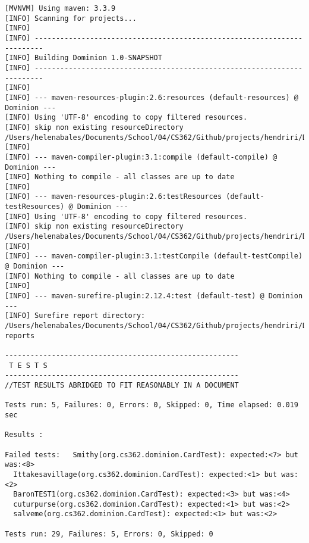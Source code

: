 \begin{lstlisting}
[MVNVM] Using maven: 3.3.9
[INFO] Scanning for projects...
[INFO]                                                                         
[INFO] ------------------------------------------------------------------------
[INFO] Building Dominion 1.0-SNAPSHOT
[INFO] ------------------------------------------------------------------------
[INFO] 
[INFO] --- maven-resources-plugin:2.6:resources (default-resources) @ Dominion ---
[INFO] Using 'UTF-8' encoding to copy filtered resources.
[INFO] skip non existing resourceDirectory /Users/helenabales/Documents/School/04/CS362/Github/projects/hendriri/Dominion/src/main/resources
[INFO] 
[INFO] --- maven-compiler-plugin:3.1:compile (default-compile) @ Dominion ---
[INFO] Nothing to compile - all classes are up to date
[INFO] 
[INFO] --- maven-resources-plugin:2.6:testResources (default-testResources) @ Dominion ---
[INFO] Using 'UTF-8' encoding to copy filtered resources.
[INFO] skip non existing resourceDirectory /Users/helenabales/Documents/School/04/CS362/Github/projects/hendriri/Dominion/src/test/resources
[INFO] 
[INFO] --- maven-compiler-plugin:3.1:testCompile (default-testCompile) @ Dominion ---
[INFO] Nothing to compile - all classes are up to date
[INFO] 
[INFO] --- maven-surefire-plugin:2.12.4:test (default-test) @ Dominion ---
[INFO] Surefire report directory: /Users/helenabales/Documents/School/04/CS362/Github/projects/hendriri/Dominion/target/surefire-reports

-------------------------------------------------------
 T E S T S
-------------------------------------------------------
//TEST RESULTS ABRIDGED TO FIT REASONABLY IN A DOCUMENT

Tests run: 5, Failures: 0, Errors: 0, Skipped: 0, Time elapsed: 0.019 sec

Results :

Failed tests:   Smithy(org.cs362.dominion.CardTest): expected:<7> but was:<8>
  Ittakesavillage(org.cs362.dominion.CardTest): expected:<1> but was:<2>
  BaronTEST1(org.cs362.dominion.CardTest): expected:<3> but was:<4>
  cuturpurse(org.cs362.dominion.CardTest): expected:<1> but was:<2>
  salveme(org.cs362.dominion.CardTest): expected:<1> but was:<2>

Tests run: 29, Failures: 5, Errors: 0, Skipped: 0


\end{lstlisting}
